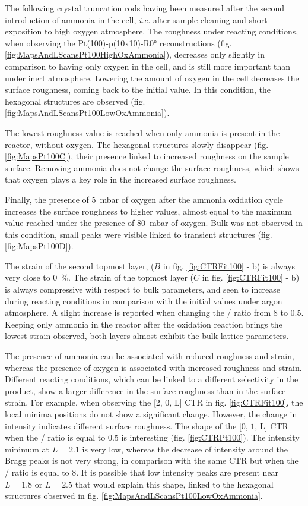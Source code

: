 The following crystal truncation rods having been measured after the second introduction of ammonia in the cell, \textit{i.e.} after sample cleaning and short exposition to high oxygen atmosphere.
The roughness under reacting conditions, when observing the Pt(100)-p(10x10)-R\ang{0} reconstructions (fig. \ref{fig:MapsAndLScansPt100HighOxAmmonia}), decreases only slightly in comparison to having only oxygen in the cell, and is still more important than under inert atmosphere.
Lowering the amount of oxygen in the cell decreases the surface roughness, coming back to the initial value.
In this condition, the hexagonal structures are observed (fig. \ref{fig:MapsAndLScansPt100LowOxAmmonia}).

The lowest roughness value is reached when only ammonia is present in the reactor, without oxygen.
The hexagonal structures slowly disappear (fig. \ref{fig:MapsPt100C}), their presence linked to increased roughness on the sample surface.
Removing ammonia does not change the surface roughness, which shows that oxygen plays a key role in the increased surface roughness.

Finally, the presence of \qty{5}{\milli\bar} of oxygen after the ammonia oxidation cycle increases the surface roughness to higher values, almost equal to the maximum value reached under the presence of \qty{80}{\milli\bar} of oxygen.
Bulk  was not observed in this condition, small peaks were visible linked to transient structures (fig. \ref{fig:MapsPt100D}).

The strain of the second topmost layer, ($B$ in fig. \ref{fig:CTRFit100} - b) is always very close to \qty{0}{\percent}.
The strain of the topmost layer ($C$ in fig. \ref{fig:CTRFit100} - b) is always compressive with respect to bulk parameters, and seen to increase during reacting conditions in comparison with the initial values under argon atmosphere.
A slight increase is reported when changing the / ratio from \num{8} to \num{0.5}.
Keeping only ammonia in the reactor after the oxidation reaction brings the lowest strain observed, both layers almost exhibit the bulk lattice parameters.

The presence of ammonia can be associated with reduced roughness and strain, whereas the presence of oxygen is associated with increased roughness and strain.
Different reacting conditions, which can be linked to a different selectivity in the product, show a larger difference in the surface roughness than in the surface strain.
For example, when observing the [2, 0, L] CTR in fig. \ref{fig:CTRFit100}, the local minima positions do not show a significant change.
However, the change in intensity indicates different surface roughness.
The shape of the [0, $\bar{1}$, L] CTR when the / ratio is equal to \num{0.5} is interesting (fig. \ref{fig:CTRPt100}).
The intensity minimum at $L=2.1$ is very low, whereas the decrease of intensity around the Bragg peaks is not very strong, in comparison with the same CTR but when the / ratio is equal to \num{8}.
It is possible that low intensity peaks are present near $L=1.8$ or $L=2.5$ that would explain this shape, linked to the hexagonal structures observed in fig. \ref{fig:MapsAndLScansPt100LowOxAmmonia}.

